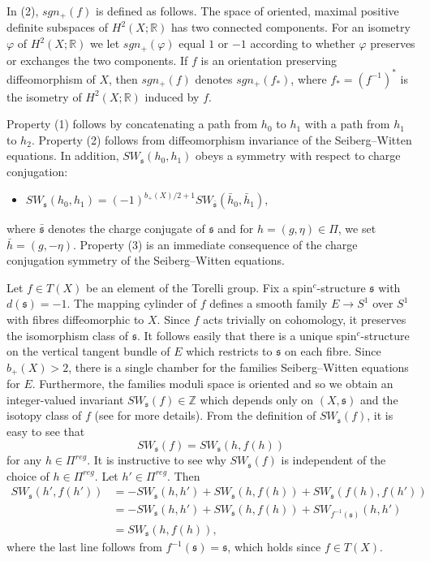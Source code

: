 \documentclass{amsart}
\theoremstyle{definition}
\theoremstyle{remark}
\numberwithin{equation}{section}
\begin{document}
In (2), $sgn_+(f)$ is defined as follows. The space of oriented, maximal positive definite subspaces of $H^2(X ; \mathbb{R})$ has two connected components. For an isometry $\varphi$ of $H^2(X ; \mathbb{R})$ we let $sgn_+(\varphi)$ equal $1$ or $-1$ according to whether $\varphi$ preserves or exchanges the two components. If $f$ is an orientation preserving diffeomorphism of $X$, then $sgn_+(f)$ denotes $sgn_+(f_*)$, where $f_* = (f^{-1})^*$ is the isometry of $H^2(X ; \mathbb{R})$ induced by $f$.

Property (1) follows by concatenating a path from $h_0$ to $h_1$ with a path from $h_1$ to $h_2$. Property (2) follows from diffeomorphism invariance of the Seiberg--Witten equations. In addition, $SW_{\mathfrak{s}}(h_0,h_1)$ obeys a symmetry with respect to charge conjugation:
\begin{itemize}
\item[(3)]{$SW_{\mathfrak{s}}(h_0 , h_1) = (-1)^{b_+(X)/2+1} SW_{\bar{\mathfrak{s}} }( \bar{h}_0 , \bar{h}_1)$,}
\end{itemize}
where $\bar{\mathfrak{s}}$ denotes the charge conjugate of $\mathfrak{s}$ and for $h = (g,\eta) \in \Pi$, we set $\bar{h} = (g , -\eta)$. Property (3) is an immediate consequence of the charge conjugation symmetry of the Seiberg--Witten equations.

Let $f \in T(X)$ be an element of the Torelli group. Fix a spin$^c$-structure $\mathfrak{s}$ with $d(\mathfrak{s}) = -1$. The mapping cylinder of $f$ defines a smooth family $E \to S^1$ over $S^1$ with fibres diffeomorphic to $X$. Since $f$ acts trivially on cohomology, it preserves the isomorphism class of $\mathfrak{s}$. It follows easily that there is a unique spin$^c$-structure on the vertical tangent bundle of $E$ which restricts to $\mathfrak{s}$ on each fibre. Since $b_+(X) > 2$, there is a single chamber for the families Seiberg--Witten equations for $E$. Furthermore, the families moduli space is oriented and so we obtain an integer-valued invariant $SW_{\mathfrak{s}}(f) \in \mathbb{Z}$ which depends only on $(X , \mathfrak{s})$ and the isotopy class of $f$ (see \cite{bk1} for more details). From the definition of $SW_{\mathfrak{s}}(f)$, it is easy to see that
\[
SW_{\mathfrak{s}}(f) = SW_{\mathfrak{s}}( h , f(h) )
\]
for any $h \in \Pi^{reg}$. It is instructive to see why $SW_{\mathfrak{s}}(f)$ is independent of the choice of $h \in \Pi^{reg}$. Let $h' \in \Pi^{reg}$. Then
\begin{align*}
SW_{\mathfrak{s}}( h' , f(h') ) &= -SW_{\mathfrak{s}}( h , h') + SW_{\mathfrak{s}}(h , f(h) ) + SW_{\mathfrak{s}}( f(h) , f(h') ) \\
&= -SW_{\mathfrak{s}}(h,h') + SW_{\mathfrak{s}}(h,f(h)) + SW_{f^{-1}(\mathfrak{s})}( h , h') \\
&= SW_{\mathfrak{s}}(h , f(h)),
\end{align*}
where the last line follows from $f^{-1}(\mathfrak{s}) = \mathfrak{s}$, which holds since $f \in T(X)$.
\end{document}
